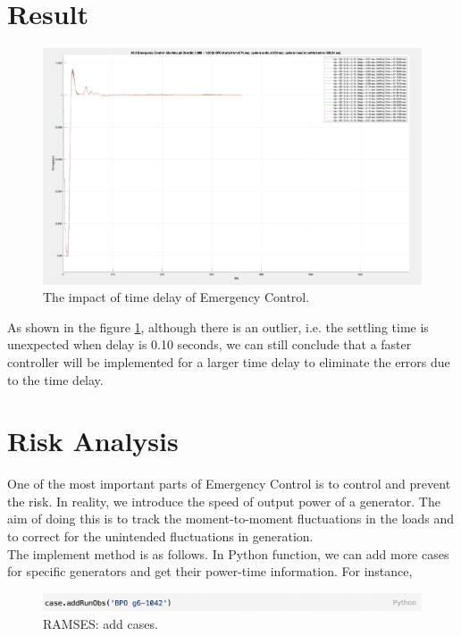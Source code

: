 \documentclass{report}
\begin{document}
\section{Result} %
\begin{figure}[htbp]
\centering
\includegraphics[width = .819\textwidth]{figure/6_3.png}
\caption{The impact of time delay of Emergency Control.}
\label{6_3}
\end{figure}

As shown in the figure \textcolor{red}{\ref{6_3}}, although there is an outlier, i.e. the settling time is unexpected when delay is 0.10 seconds, we can still conclude that a faster controller will be implemented for a larger time delay to eliminate the errors due to the time delay.\\

\section{Risk Analysis}
One of the most important parts of Emergency Control is to control and prevent the risk.  In reality, we introduce the speed of output power of a generator. The aim of doing this is to track the moment-to-moment fluctuations in the loads and to correct for the unintended fluctuations in generation.\\


The implement method is as follows. In Python function, we can add more cases for specific generators and get their power-time information. For instance, \\

\begin{figure}[htbp]
\centering
\includegraphics[width = .819\textwidth]{figure/6_5_code1.png}
\caption{RAMSES: add cases.}
\label{6_5_code1}
\end{figure}
\end{document}
